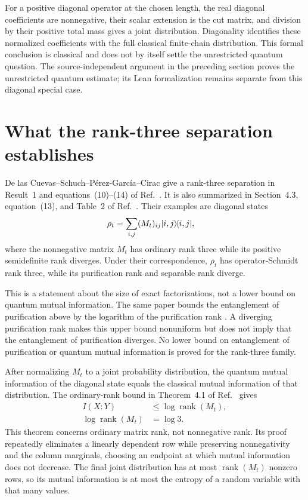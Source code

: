 \documentclass[11pt]{article}
\begin{document}
For a positive diagonal operator at the chosen length, the real diagonal
coefficients are nonnegative, their scalar extension is the cut matrix, and
division by their positive total mass gives a joint distribution. Diagonality
identifies these normalized coefficients with the full classical finite-chain
distribution. This formal conclusion is classical and does not by itself
settle the unrestricted quantum question. The source-independent argument in
the preceding section proves the unrestricted quantum estimate; its Lean
formalization remains separate from this diagonal special case.

\section{What the rank-three separation establishes}

De las Cuevas--Schuch--P\'erez-Garc\'ia--Cirac give a rank-three separation in
Result~1 and equations~(10)--(14) of
Ref.~\cite{DeLasCuevas2013Purifications}. It is also summarized in
Section~4.3, equation~(13), and Table~2 of
Ref.~\cite{DeLasCuevas2019Separability}. Their examples are diagonal states
\begin{align}
    \rho_t
        &=
        \sum_{i,j}(M_t)_{ij}|i,j\rangle\!\langle i,j|,
    \label{eq:cpgsv17_rank_three_diagonal_states}
\end{align}
where the nonnegative matrix $M_t$ has ordinary rank three while its positive
semidefinite rank diverges. Under their correspondence, $\rho_t$ has
operator-Schmidt rank three, while its purification rank and separable rank
diverge.

This is a statement about the size of exact factorizations, not a lower bound
on quantum mutual information. The same paper bounds the entanglement of
purification above by the logarithm of the purification rank
\cite{DeLasCuevas2013Purifications}. A diverging purification rank makes this
upper bound nonuniform but does not imply that the entanglement of purification
diverges. No lower bound on entanglement of purification or quantum mutual
information is proved for the rank-three family.

After normalizing $M_t$ to a joint probability distribution, the quantum
mutual information of the diagonal state equals the classical mutual
information of that distribution. The ordinary-rank bound in Theorem~4.1 of
Ref.~\cite{Riazanov2017PSDRank} gives
\begin{align}
    I(X:Y)
        &\leq \log\operatorname{rank}(M_t),
    \label{eq:cpgsv17_rank_three_information_rank_bound}\\
    \log\operatorname{rank}(M_t)
        &= \log 3.
    \label{eq:cpgsv17_rank_three_uniform_information_bound}
\end{align}
This theorem concerns ordinary matrix rank, not nonnegative rank. Its proof
repeatedly eliminates a linearly dependent row while preserving nonnegativity
and the column marginals, choosing an endpoint at which mutual information
does not decrease. The final joint distribution has at most
$\operatorname{rank}(M_t)$ nonzero rows, so its mutual information is at most
the entropy of a random variable with that many values.
\end{document}
